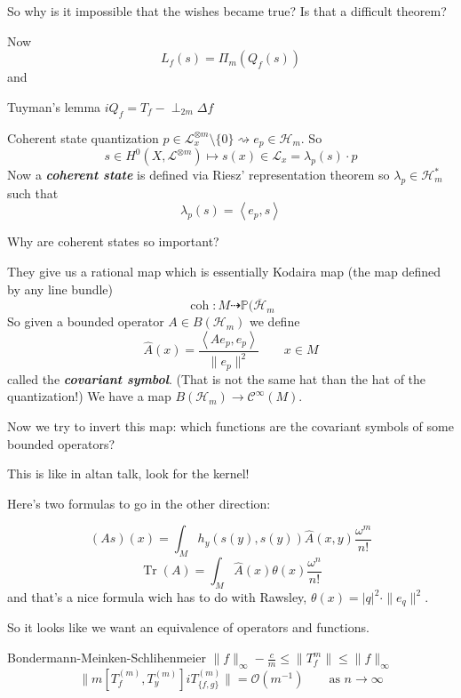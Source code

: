 \begin{question}[Dani]\leavevmode
	So why is it impossible that the wishes became true? Is that a difficult theorem?
\end{question}

Now 
\[L_f(s)=\Pi_m(Q_f(s))\]
and
\begin{thing9}{Tuyman's lemma}\leavevmode
	$iQ_f=T_f-\perp_{2m}\Delta f$
\end{thing9}

\begin{thing8}{Coherent state quantization}\leavevmode
	$ p \in \mathcal{L}_x^{\otimes m}\setminus \{0\} \rightsquigarrow e_p \in \mathcal{H}_m$. So
	\[s \in H^{0}(X,\mathcal{L}^{\otimes m})\longmapsto s(x)\in\mathcal{L}_x=\lambda_p(s)\cdot p\]
	Now a \textit{\textbf{coherent state}} is defined via Riesz' representation theorem so  $\lambda_p \in\mathcal{H}_m^*$ such that
	\[\lambda_p(s)=\left<e_p,s\right> \]
\end{thing8}

\begin{question}[Dani]\leavevmode
	Why are coherent states so important?
\end{question}

They give us a rational map which is essentially Kodaira map (the map defined by any line bundle)
\[\operatorname{coh}:M\dashrightarrow \mathbb{P}(\overline{\mathcal{H}}_m\]
So given a bounded operator $A\in B(\mathcal{H}_m)$ we define \[\hat{A}(x)=\frac{\left<Ae_p,e_p\right> }{\|e_p\|^2}\qquad  x\in M\]
called the \textit{\textbf{covariant symbol}}.  {\color{7}(That is not the same hat than the hat of the quantization!)} We have a map $B (\mathcal{H}_m)\to  \mathcal{C}^\infty(M)$.

Now we try to invert this map: which functions are the covariant symbols of some bounded operators?

\begin{remark}[Sergey]\leavevmode
	This is like in altan talk, look for the kernel!
\end{remark}

Here's two formulas to go in the other direction:

\[(As)(x)=\int_{M}h_y(s(y),s(y))\hat{A}(x,y)\frac{\omega^m}{n!}\]
\[\operatorname{Tr}(A)=\int_{M}\hat{A}(x)\theta(x)\frac{\omega^n}{n!}\]
and that's a nice formula wich has to do with Rawsley, $\theta(x)=|q|^2\cdot\|e_q\|^2$.

\begin{remark}[Dani]\leavevmode
	So it looks like we want an equivalence of operators and functions.
\end{remark}

\begin{thing7}{Bondermann-Meinken-Schlihenmeier}\leavevmode
	$\|f\|_\infty-\frac{c}{m}\leq \|T_f^{m}\|\leq \|f\|_\infty$
	\[\|m[T_f^{(m)}, T_y^{(m)} ]iT_{\{f,g\}}^{(m)}\|= \mathcal{O}(m^{-1})\qquad \text{as }n\to \infty \]
\end{thing7}


